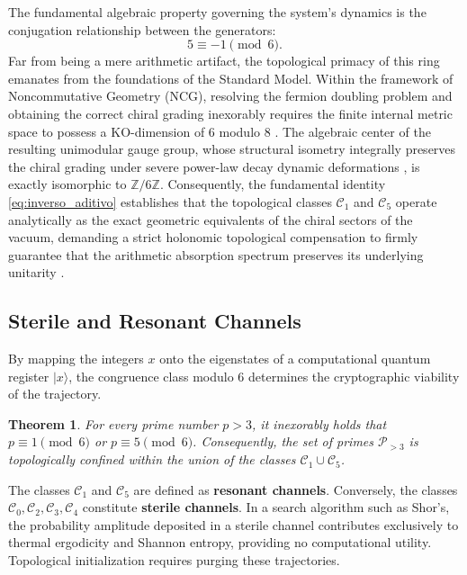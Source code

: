 \documentclass[12pt,a4paper]{article}
\theoremstyle{plain}
\newtheorem{theorem}{Theorem}[section]
\theoremstyle{definition}
\theoremstyle{remark}
\begin{document}
The fundamental algebraic property governing the system's dynamics is the conjugation relationship between the generators:
\begin{equation}
5 \equiv -1 \pmod{6}.
\label{eq:inverso_aditivo}
\end{equation}
Far from being a mere arithmetic artifact, the topological primacy of this ring emanates from the foundations of the Standard Model. Within the framework of Noncommutative Geometry (NCG), resolving the fermion doubling problem and obtaining the correct chiral grading inexorably requires the finite internal metric space to possess a KO-dimension of 6 modulo 8 \cite{Connes2008, Peinador_Emergencia_Geometria_2025}. The algebraic center of the resulting unimodular gauge group, whose structural isometry integrally preserves the chiral grading under severe power-law decay dynamic deformations \cite{Peinador_Modular_Quantum_Chaos_2026}, is exactly isomorphic to $\mathbb{Z}/6\mathbb{Z}$. Consequently, the fundamental identity \eqref{eq:inverso_aditivo} establishes that the topological classes $\mathcal{C}_1$ and $\mathcal{C}_5$ operate analytically as the exact geometric equivalents of the chiral sectors of the vacuum, demanding a strict holonomic topological compensation to firmly guarantee that the arithmetic absorption spectrum preserves its underlying unitarity \cite{Peinador_Dualidad_Riemann_2026, Peinador_Modular_Quantum_Chaos_2026}.

\subsection{Sterile and Resonant Channels}

By mapping the integers $x$ onto the eigenstates of a computational quantum register $|x\rangle$, the congruence class modulo 6 determines the cryptographic viability of the trajectory. 

\begin{theorem}
For every prime number $p>3$, it inexorably holds that $p \equiv 1 \pmod{6}$ or $p \equiv 5 \pmod{6}$. Consequently, the set of primes $\mathcal{P}_{>3}$ is topologically confined within the union of the classes $\mathcal{C}_1 \cup \mathcal{C}_5$.
\end{theorem}

The classes $\mathcal{C}_1$ and $\mathcal{C}_5$ are defined as \textbf{resonant channels}. Conversely, the classes $\mathcal{C}_0,\mathcal{C}_2,\mathcal{C}_3,\mathcal{C}_4$ constitute \textbf{sterile channels}. In a search algorithm such as Shor's, the probability amplitude deposited in a sterile channel contributes exclusively to thermal ergodicity and Shannon entropy, providing no computational utility. Topological initialization requires purging these trajectories.
\end{document}
